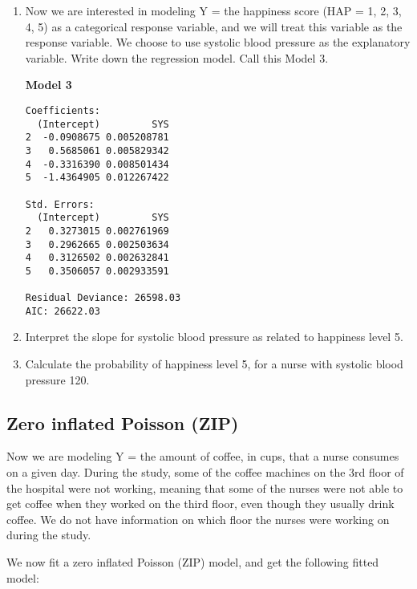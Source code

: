 \documentclass[11pt]{article}
\begin{document}
\begin{enumerate}

\item Now we are interested in modeling Y = the happiness score (HAP = 1, 2, 3, 4, 5) as a categorical response variable, and we will treat this variable as the response variable. We choose to use systolic blood pressure as the explanatory variable. Write down the regression model. Call this Model 3. 


\newpage


\textbf{Model 3} 

\begin{verbatim}
Coefficients:
  (Intercept)         SYS 
2  -0.0908675 0.005208781
3   0.5685061 0.005829342
4  -0.3316390 0.008501434
5  -1.4364905 0.012267422

Std. Errors:
  (Intercept)         SYS
2   0.3273015 0.002761969
3   0.2962665 0.002503634
4   0.3126502 0.002632841
5   0.3506057 0.002933591

Residual Deviance: 26598.03 
AIC: 26622.03 
\end{verbatim} 

\item Interpret the slope for systolic blood pressure as related to happiness level 5. 


\vspace{4cm} 

\item Calculate the probability of happiness level 5, for a nurse with systolic blood pressure 120.

\end{enumerate}

\pagebreak

\subsection{Zero inflated Poisson (ZIP)}

Now we are modeling Y = the amount of coffee, in cups, that a nurse consumes on a given day. During the study, some of the coffee machines on the 3rd floor of the hospital were not working, meaning that some of the nurses were not able to get coffee when they worked on the third floor, even though they usually drink coffee. We do not have information on which floor the nurses were working on during the study.

We now fit a zero inflated Poisson (ZIP) model, and get the following fitted model:
\end{document}

